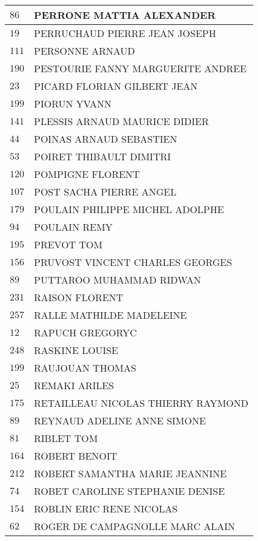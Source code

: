 \begin{xltabular}{\linewidth}{|l|X|}
    \hline
    $86$ & PERRONE MATTIA ALEXANDER \\
    \hline
    $19$ & PERRUCHAUD PIERRE JEAN JOSEPH \\
    \hline
    $111$ & PERSONNE ARNAUD \\
    \hline
    $190$ & PESTOURIE FANNY MARGUERITE ANDREE \\
    \hline
    $23$ & PICARD FLORIAN GILBERT JEAN \\
    \hline
    $199$ & PIORUN YVANN \\
    \hline
    $141$ & PLESSIS ARNAUD MAURICE DIDIER \\
    \hline
    $44$ & POINAS ARNAUD SEBASTIEN \\
    \hline
    $53$ & POIRET THIBAULT DIMITRI \\
    \hline
    $120$ & POMPIGNE FLORENT \\
    \hline
    $107$ & POST SACHA PIERRE ANGEL \\
    \hline
    $179$ & POULAIN PHILIPPE MICHEL ADOLPHE \\
    \hline
    $94$ & POULAIN REMY \\
    \hline
    $195$ & PREVOT TOM \\
    \hline
    $156$ & PRUVOST VINCENT CHARLES GEORGES \\
    \hline
    $89$ & PUTTAROO MUHAMMAD RIDWAN \\
    \hline
    $231$ & RAISON FLORENT \\
    \hline
    $257$ & RALLE MATHILDE MADELEINE \\
    \hline
    $12$ & RAPUCH GREGORYC \\
    \hline
    $248$ & RASKINE LOUISE \\
    \hline
    $199$ & RAUJOUAN THOMAS \\
    \hline
    $25$ & REMAKI ARILES \\
    \hline
    $175$ & RETAILLEAU NICOLAS THIERRY RAYMOND \\
    \hline
    $89$ & REYNAUD ADELINE ANNE SIMONE \\
    \hline
    $81$ & RIBLET TOM \\
    \hline
    $164$ & ROBERT BENOIT \\
    \hline
    $212$ & ROBERT SAMANTHA MARIE JEANNINE \\
    \hline
    $74$ & ROBET CAROLINE STEPHANIE DENISE \\
    \hline
    $154$ & ROBLIN ERIC RENE NICOLAS \\
    \hline
    $62$ & ROGER DE CAMPAGNOLLE MARC ALAIN \\

\end{xltabular}
